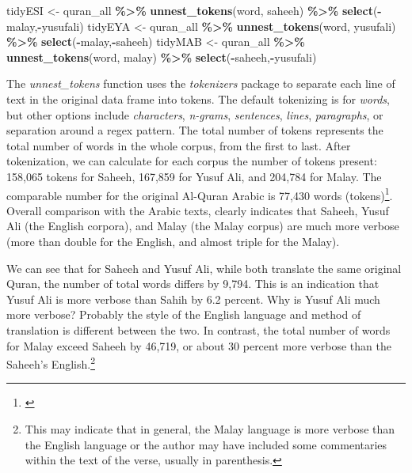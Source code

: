 \documentclass[
]{article}
\newenvironment{Shaded}{\begin{snugshade}}{\end{snugshade}}
\newcommand{\FunctionTok}[1]{\textcolor[rgb]{0.13,0.29,0.53}{\textbf{#1}}}
\newcommand{\NormalTok}[1]{#1}
\newcommand{\OtherTok}[1]{\textcolor[rgb]{0.56,0.35,0.01}{#1}}
\newcommand{\SpecialCharTok}[1]{\textcolor[rgb]{0.81,0.36,0.00}{\textbf{#1}}}
\begin{document}
\footnotesize

\begin{Shaded}
\begin{Highlighting}[]
\NormalTok{tidyESI }\OtherTok{\textless{}{-}}\NormalTok{ quran\_all }\SpecialCharTok{\%\textgreater{}\%}
  \FunctionTok{unnest\_tokens}\NormalTok{(word, saheeh) }\SpecialCharTok{\%\textgreater{}\%} \FunctionTok{select}\NormalTok{(}\SpecialCharTok{{-}}\NormalTok{malay,}\SpecialCharTok{{-}}\NormalTok{yusufali)}
\NormalTok{tidyEYA }\OtherTok{\textless{}{-}}\NormalTok{ quran\_all }\SpecialCharTok{\%\textgreater{}\%}
  \FunctionTok{unnest\_tokens}\NormalTok{(word, yusufali) }\SpecialCharTok{\%\textgreater{}\%} \FunctionTok{select}\NormalTok{(}\SpecialCharTok{{-}}\NormalTok{malay,}\SpecialCharTok{{-}}\NormalTok{saheeh)}
\NormalTok{tidyMAB }\OtherTok{\textless{}{-}}\NormalTok{ quran\_all }\SpecialCharTok{\%\textgreater{}\%}
  \FunctionTok{unnest\_tokens}\NormalTok{(word, malay) }\SpecialCharTok{\%\textgreater{}\%} \FunctionTok{select}\NormalTok{(}\SpecialCharTok{{-}}\NormalTok{saheeh,}\SpecialCharTok{{-}}\NormalTok{yusufali)}
\end{Highlighting}
\end{Shaded}

\normalsize

The \emph{unnest\_tokens} function uses the \emph{tokenizers} package to separate each line of text in the original data frame into tokens. The default tokenizing is for \emph{words}, but other options include \emph{characters}, \emph{n-grams}, \emph{sentences}, \emph{lines}, \emph{paragraphs}, or separation around a regex pattern. The total number of tokens represents the total number of words in the whole corpus, from the first to last. After tokenization, we can calculate for each corpus the number of tokens present: 158,065 tokens for Saheeh, 167,859 for Yusuf Ali, and 204,784 for Malay. The comparable number for the original Al-Quran Arabic is 77,430 words (tokens)\footnote{\citet{dukes2010}}. Overall comparison with the Arabic texts, clearly indicates that Saheeh, Yusuf Ali (the English corpora), and Malay (the Malay corpus) are much more verbose (more than double for the English, and almost triple for the Malay).

We can see that for Saheeh and Yusuf Ali, while both translate the same original Quran, the number of total words differs by 9,794. This is an indication that Yusuf Ali is more verbose than Sahih by 6.2 percent. Why is Yusuf Ali much more verbose? Probably the style of the English language and method of translation is different between the two. In contrast, the total number of words for Malay exceed Saheeh by 46,719, or about 30 percent more verbose than the Saheeh's English.\footnote{This may indicate that in general, the Malay language is more verbose than the English language or the author may have included some commentaries within the text of the verse, usually in parenthesis.}
\end{document}

